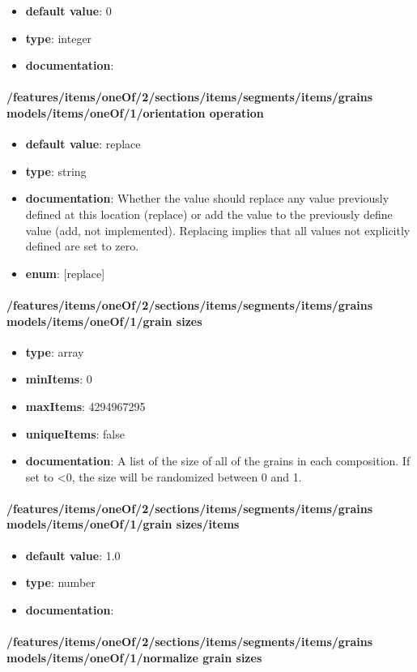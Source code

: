 \begin{itemize}\item {\bf default value}: 0
\item {\bf type}: integer
\item {\bf documentation}: 
\end{itemize}\paragraph{/features/items/oneOf/2/sections/items/segments/items/grains models/items/oneOf/1/orientation operation}
\begin{itemize}\item {\bf default value}: replace
\item {\bf type}: string
\item {\bf documentation}: Whether the value should replace any value previously defined at this location (replace) or add the value to the previously define value (add, not implemented). Replacing implies that all values not explicitly defined are set to zero.
\item {\bf enum}: [replace]\end{itemize}\paragraph{/features/items/oneOf/2/sections/items/segments/items/grains models/items/oneOf/1/grain sizes}
\begin{itemize}\item {\bf type}: array
\item {\bf minItems}: 0
\item {\bf maxItems}: 4294967295
\item {\bf uniqueItems}: false
\item {\bf documentation}: A list of the size of all of the grains in each composition. If set to <0, the size will be randomized between 0 and 1.
\end{itemize}\paragraph{/features/items/oneOf/2/sections/items/segments/items/grains models/items/oneOf/1/grain sizes/items}
\begin{itemize}\item {\bf default value}: 1.0
\item {\bf type}: number
\item {\bf documentation}: 
\end{itemize}\paragraph{/features/items/oneOf/2/sections/items/segments/items/grains models/items/oneOf/1/normalize grain sizes}
